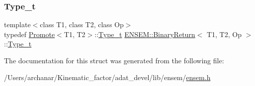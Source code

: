 \mbox{\label{structENSEM_1_1BinaryReturn_a8e4e01e2c9cd832cfe1a41a67305ac06}} 
\subsubsection{\texorpdfstring{Type\_t}{Type\_t}\hspace{0.1cm}{\footnotesize\ttfamily [2/2]}}
{\footnotesize\ttfamily template$<$class T1, class T2, class Op$>$ \\
typedef \mbox{\hyperlink{structENSEM_1_1Promote}{Promote}}$<$T1, T2$>$\+::\mbox{\hyperlink{structENSEM_1_1BinaryReturn_a8e4e01e2c9cd832cfe1a41a67305ac06}{Type\+\_\+t}} \mbox{\hyperlink{structENSEM_1_1BinaryReturn}{E\+N\+S\+E\+M\+::\+Binary\+Return}}$<$ T1, T2, Op $>$\+::\mbox{\hyperlink{structENSEM_1_1BinaryReturn_a8e4e01e2c9cd832cfe1a41a67305ac06}{Type\+\_\+t}}}



The documentation for this struct was generated from the following file\+:\begin{DoxyCompactItemize}
\item 
/\+Users/archanar/\+Kinematic\+\_\+factor/adat\+\_\+devel/lib/ensem/\mbox{\hyperlink{lib_2ensem_2ensem_8h}{ensem.\+h}}\end{DoxyCompactItemize}
